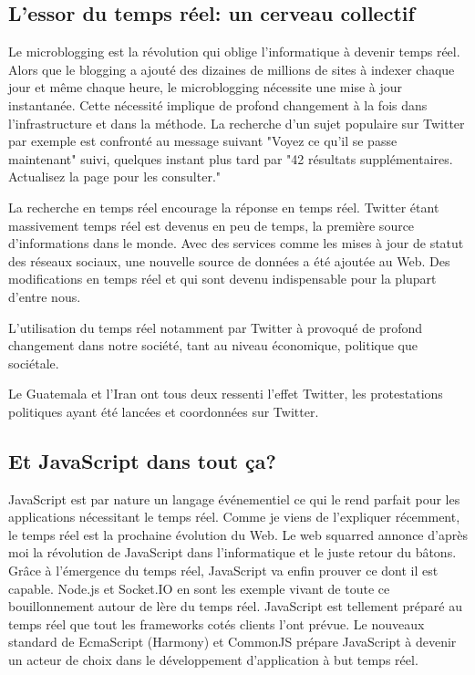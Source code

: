 \subsection{L'essor du temps réel: un cerveau collectif}

Le microblogging est la révolution qui oblige l'informatique à devenir temps réel. Alors que le blogging a ajouté des dizaines de millions de sites à indexer chaque jour et même chaque heure, le microblogging nécessite une mise à jour instantanée. Cette nécessité implique de profond changement à la fois dans l'infrastructure et dans la méthode. La recherche d'un sujet populaire sur Twitter par exemple est confronté au message suivant "Voyez ce qu'il se passe maintenant" suivi, quelques instant plus tard par "42 résultats supplémentaires. Actualisez la page pour les consulter."

La recherche en temps réel encourage la réponse en temps réel. Twitter étant massivement temps réel est devenus en peu de temps, la première source d'informations dans le monde. Avec des services comme les mises à jour de statut des réseaux sociaux, une nouvelle source de données a été ajoutée au Web. Des modifications en temps réel et qui sont devenu indispensable pour la plupart d'entre nous.

L'utilisation du temps réel notamment par Twitter à provoqué de profond changement dans notre société, tant au niveau économique, politique que sociétale.

Le Guatemala et l'Iran ont tous deux ressenti l'effet Twitter, les protestations politiques ayant été lancées et coordonnées sur Twitter.

\subsection{Et JavaScript dans tout ça?}

JavaScript est par nature un langage événementiel ce qui le rend parfait pour les applications nécessitant le temps réel. Comme je viens de l'expliquer récemment, le temps réel est la prochaine évolution du Web. Le web squarred annonce d'après moi la révolution de JavaScript dans l'informatique et le juste retour du bâtons. Grâce à l'émergence du temps réel, JavaScript va enfin prouver ce dont il est capable. Node.js et Socket.IO en sont les exemple vivant de toute ce bouillonnement autour de lère du temps réel. JavaScript est tellement préparé au temps réel que tout les frameworks cotés clients l'ont prévue. Le nouveaux standard de EcmaScript (Harmony) et CommonJS prépare JavaScript à devenir un acteur de choix dans le développement d'application à but temps réel.



